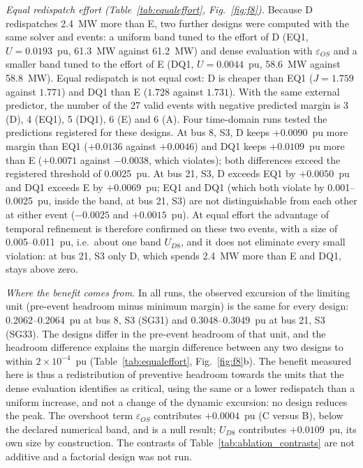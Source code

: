 \emph{Equal redispatch effort (Table~\ref{tab:equaleffort}, Fig.~\ref{fig:f8}).} Because D redispatches 2.4~MW more than E, two further designs were computed with the same solver and events: a uniform band tuned to the effort of D (EQ1, $U=0.0193$~pu, 61.3~MW against 61.2~MW) and dense evaluation with $\varepsilon_{OS}$ and a smaller band tuned to the effort of E (DQ1, $U=0.0044$~pu, 58.6~MW against 58.8~MW). Equal redispatch is not equal cost: D is cheaper than EQ1 ($J=1.759$ against $1.771$) and DQ1 than E ($1.728$ against $1.731$). With the same external predictor, the number of the 27 valid events with negative predicted margin is 3 (D), 4 (EQ1), 5 (DQ1), 6 (E) and 6 (A). Four time-domain runs tested the predictions registered for these designs. At bus 8, S3, D keeps $+0.0090$~pu more margin than EQ1 ($+0.0136$ against $+0.0046$) and DQ1 keeps $+0.0109$~pu more than E ($+0.0071$ against $-0.0038$, which violates); both differences exceed the registered threshold of 0.0025~pu. At bus 21, S3, D exceeds EQ1 by $+0.0050$~pu and DQ1 exceeds E by $+0.0069$~pu; EQ1 and DQ1 (which both violate by 0.001--0.0025~pu, inside the band, at bus 21, S3) are not distinguishable from each other at either event ($-0.0025$ and $+0.0015$~pu). At equal effort the advantage of temporal refinement is therefore confirmed on these two events, with a size of 0.005--0.011~pu, i.e.\ about one band $U_{D8}$, and it does not eliminate every small violation: at bus 21, S3 only D, which spends 2.4~MW more than E and DQ1, stays above zero.

\emph{Where the benefit comes from.} In all runs, the observed excursion of the limiting unit (pre-event headroom minus minimum margin) is the same for every design: 0.2062--0.2064~pu at bus 8, S3 (SG31) and 0.3048--0.3049~pu at bus 21, S3 (SG33). The designs differ in the pre-event headroom of that unit, and the headroom difference explains the margin difference between any two designs to within $2\times10^{-4}$~pu (Table~\ref{tab:equaleffort}, Fig.~\ref{fig:f8}b). The benefit measured here is thus a redistribution of preventive headroom towards the units that the dense evaluation identifies as critical, using the same or a lower redispatch than a uniform increase, and not a change of the dynamic excursion: no design reduces the peak. The overshoot term $\varepsilon_{OS}$ contributes $+0.0004$~pu (C versus B), below the declared numerical band, and is a null result; $U_{D8}$ contributes $+0.0109$~pu, its own size by construction. The contrasts of Table~\ref{tab:ablation_contrasts} are not additive and a factorial design was not run.

